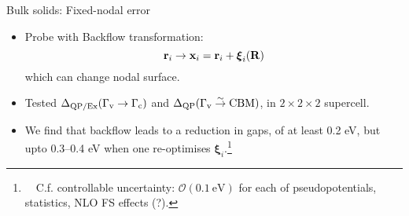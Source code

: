 \documentclass[10pt, pdf, hyperref={draft}, usenames, dvipsnames]{beamer}
\newcommand{\red}[1]{{\bf\color{LancsRed}{#1}}}
\begin{document}
\begin{frame}{Bulk solids: Fixed-nodal error}
\begin{itemize}
  \item Probe with Backflow transformation:
  \begin{equation}
    {\bf r}_i \rightarrow {\bf x}_i = {\bf r}_i + {\boldsymbol \xi}_i({\bf R})
  \end{equation}
  which can change nodal surface.~
  \item Tested $\Delta_{\text{QP/Ex}}(\Gamma_{\rm v} \rightarrow \Gamma_{\rm
  c})$ and $\Delta_{\text{QP}}(\Gamma_{\rm v} \overset{\sim}{\rightarrow}
  \text{CBM})$, in $2\times2\times2$ supercell.
  \item We find that backflow leads to a reduction in gaps, of at least 0.2
  eV, but upto 0.3--0.4 eV when one re-optimises ${\boldsymbol
  \xi}_i$.\footnote{~~C.f. controllable uncertainty: $\mathcal{O}(0.1\
  \text{eV})$ for each of pseudopotentials, statistics, NLO FS effects (?).}
\end{itemize}
\end{frame}

\end{document}
